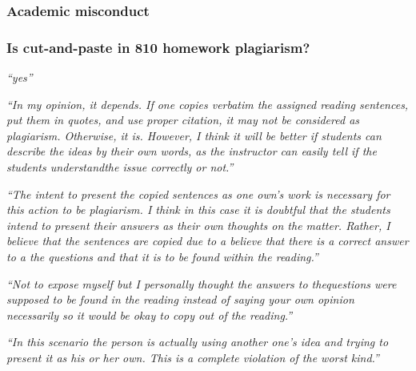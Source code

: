 \documentclass[12pt]{beamer}
\newcommand\ans[1]{{\it ``#1''}}
\newcommand\gap{\vspace{5mm}}
\begin{document}

\begin{frame}

\frametitle{
Academic misconduct
}

\end{frame}

\begin{frame} %

\frametitle{ Is cut-and-paste in 810 homework plagiarism?}

\ans{yes}


\gap

\ans{In  my  opinion,  it  depends.   If  one  copies  verbatim  the  assigned  reading sentences, put them in quotes, and use proper citation, it may not be considered as plagiarism.  Otherwise, it is.  However, I think it will be better if students can describe the ideas by their own words, as the instructor can easily tell if the students understandthe issue correctly or not.}

\end{frame}

\begin{frame}
\ans{The intent to present the copied sentences as one own's work is necessary for this action to be plagiarism.  I think in this case it is doubtful that the students intend to present their answers as their own thoughts on the matter.  Rather, I believe that the sentences are copied due to a believe that there is a correct answer to a the questions and that it is to be found within the reading.}
\end{frame}


\begin{frame}
\ans{Not  to  expose  myself  but  I  personally  thought  the  answers  to  thequestions were supposed to be found in the reading instead of saying your own opinion necessarily so it would be okay to copy out of the reading.}

\ans{In  this  scenario  the  person  is  actually using another one's idea and trying to present it as his or her own.  This is a complete violation of the worst kind.}

\end{frame}
\end{document}
